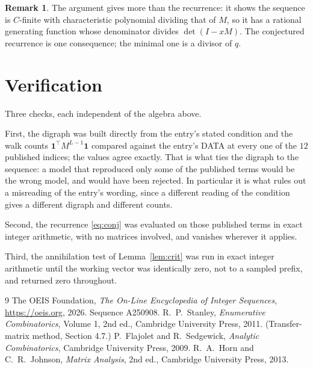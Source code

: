 \documentclass[11pt,a4paper]{article}
\theoremstyle{plain}
\theoremstyle{definition}
\newtheorem{remark}[theorem]{Remark}
\begin{document}
\begin{remark}
The argument gives more than the recurrence: it shows the sequence is $C$-finite with
characteristic polynomial dividing that of $M$, so it has a rational generating function
whose denominator divides $\det(I-xM)$. The conjectured recurrence is one consequence; the
minimal one is a divisor of $q$.
\end{remark}

\section{Verification}

Three checks, each independent of the algebra above.

First, the digraph was built directly from the entry's stated condition and the walk counts
$\mathbf{1}^{\!\top}M^{L-1}\mathbf{1}$ compared against the entry's DATA at
every one of the $12$ published indices; the values agree exactly. That is what ties
the digraph to the sequence: a model that reproduced only some of the published terms would
be the wrong model, and would have been rejected. In particular it is what rules out a
misreading of the entry's wording, since a different reading of the condition gives a
different digraph and different counts.

Second, the recurrence \eqref{eq:conj} was evaluated on those published terms in exact
integer arithmetic, with no matrices involved, and vanishes wherever it applies.

Third, the annihilation test of Lemma~\ref{lem:crit} was run in exact integer arithmetic
until the working vector was identically zero, not to a sampled prefix, and returned zero
throughout.

\begin{thebibliography}{9}
 The OEIS Foundation, \emph{The On-Line Encyclopedia of Integer
Sequences}, \url{https://oeis.org}, 2026. Sequence A250908.
 R.~P.~Stanley, \emph{Enumerative Combinatorics}, Volume 1, 2nd ed.,
Cambridge University Press, 2011. (Transfer-matrix method, Section 4.7.)
 P.~Flajolet and R.~Sedgewick, \emph{Analytic Combinatorics}, Cambridge
University Press, 2009.
 R.~A.~Horn and C.~R.~Johnson, \emph{Matrix Analysis}, 2nd ed., Cambridge
University Press, 2013.
\end{thebibliography}
\end{document}
